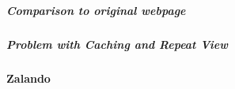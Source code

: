 






\subparagraph{Comparison to original webpage}






\subparagraph{Problem with Caching and Repeat View}






\paragraph{Zalando}




